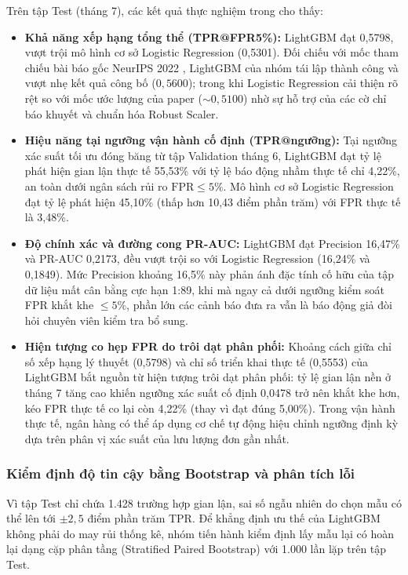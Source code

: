Trên tập Test (tháng 7), các kết quả thực nghiệm trong  cho thấy:
\begin{itemize}[leftmargin=*]
  \item \textbf{Khả năng xếp hạng tổng thể (TPR@FPR5\%):} LightGBM đạt 0,5798, vượt trội mô hình cơ sở Logistic Regression (0,5301). Đối chiếu với mốc tham chiếu bài báo gốc NeurIPS 2022 \cite{jesus2022turning}, LightGBM của nhóm tái lập thành công và vượt nhẹ kết quả công bố ($0,5600$); trong khi Logistic Regression cải thiện rõ rệt so với mốc ước lượng của paper ($\sim 0,5100$) nhờ sự hỗ trợ của các cờ chỉ báo khuyết và chuẩn hóa Robust Scaler.
  \item \textbf{Hiệu năng tại ngưỡng vận hành cố định (TPR@ngưỡng):} Tại ngưỡng xác suất tối ưu đóng băng từ tập Validation tháng 6, LightGBM đạt tỷ lệ phát hiện gian lận thực tế 55,53\% với tỷ lệ báo động nhầm thực tế chỉ 4,22\%, an toàn dưới ngân sách rủi ro $\text{FPR} \le 5\%$. Mô hình cơ sở Logistic Regression đạt tỷ lệ phát hiện 45,10\% (thấp hơn 10,43 điểm phần trăm) với FPR thực tế là 3,48\%.
  \item \textbf{Độ chính xác và đường cong PR-AUC:} LightGBM đạt Precision 16,47\% và PR-AUC 0,2173, đều vượt trội so với Logistic Regression (16,24\% và 0,1849). Mức Precision khoảng 16,5\% này phản ánh đặc tính cố hữu của tập dữ liệu mất cân bằng cực hạn 1:89, khi mà ngay cả dưới ngưỡng kiểm soát FPR khắt khe $\le 5\%$, phần lớn các cảnh báo đưa ra vẫn là báo động giả đòi hỏi chuyên viên kiểm tra bổ sung.
  \item \textbf{Hiện tượng co hẹp FPR do trôi dạt phân phối:} Khoảng cách giữa chỉ số xếp hạng lý thuyết (0,5798) và chỉ số triển khai thực tế (0,5553) của LightGBM bắt nguồn từ hiện tượng trôi dạt phân phối: tỷ lệ gian lận nền ở tháng 7 tăng cao khiến ngưỡng xác suất cố định 0,0478 trở nên khắt khe hơn, kéo FPR thực tế co lại còn 4,22\% (thay vì đạt đúng 5,00\%). Trong vận hành thực tế, ngân hàng có thể áp dụng cơ chế tự động hiệu chỉnh ngưỡng định kỳ dựa trên phân vị xác suất của lưu lượng đơn gần nhất.
\end{itemize}

\subsubsection{Kiểm định độ tin cậy bằng Bootstrap và phân tích lỗi}
Vì tập Test chỉ chứa 1.428 trường hợp gian lận, sai số ngẫu nhiên do chọn mẫu có thể lên tới $\pm 2,5$ điểm phần trăm TPR. Để khẳng định ưu thế của LightGBM không phải do may rủi thống kê, nhóm tiến hành kiểm định lấy mẫu lại có hoàn lại dạng cặp phân tầng (Stratified Paired Bootstrap) với 1.000 lần lặp trên tập Test.

